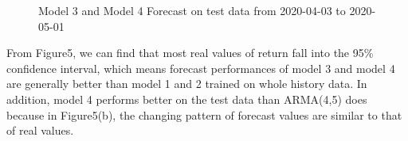\documentclass [letterpaper] {article}
\begin{document}
\begin{figure}[htp]
	\centering
	\quad
	\caption{Model 3 and Model 4 Forecast on test data from 2020-04-03 to 2020-05-01}
\end{figure}
From Figure5, we can find that most real values of return fall into the 95\% confidence interval, which means forecast performances of model 3 and model 4  are generally better than model 1 and 2 trained on whole history data. In addition, model 4 performs better on the test data than ARMA(4,5) does because in Figure5(b), the changing pattern of forecast values are similar to that of real values. 
\end{document}
